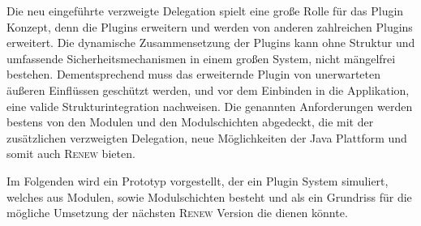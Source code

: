 	Die neu eingeführte verzweigte Delegation spielt eine große Rolle für das Plugin Konzept, denn die Plugins erweitern und werden von anderen zahlreichen Plugins erweitert. Die dynamische Zusammensetzung der Plugins kann ohne Struktur und umfassende Sicherheitsmechanismen in einem großen System, nicht mängelfrei bestehen. Dementsprechend muss das erweiternde Plugin von unerwarteten äußeren Einflüssen geschützt werden, und vor dem Einbinden in die Applikation, eine valide Strukturintegration nachweisen. Die genannten Anforderungen werden bestens von den Modulen und den Modulschichten abgedeckt, die mit der zusätzlichen verzweigten Delegation, neue Möglichkeiten der Java Plattform  und somit auch \textsc{Renew} bieten.\bigbreak

	Im Folgenden wird ein Prototyp vorgestellt, der ein Plugin System simuliert, welches aus Modulen, sowie  Modulschichten besteht und als ein Grundriss für die mögliche Umsetzung der nächsten \textsc{Renew} Version die dienen könnte. \bigbreak
			
